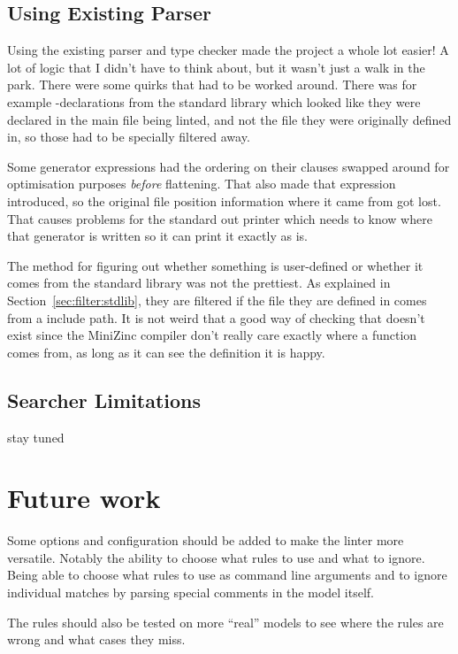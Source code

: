 \documentclass[a4paper,12pt]{article}
\newcommand{\mi}[1]{\mbox{\mzninline{#1}}}
\begin{document}
\subsection{Using Existing Parser}
Using the existing parser and type checker made the project a whole lot easier! A lot of
logic that I didn't have to think about, but it wasn't just a walk in the park. There were
some quirks that had to be worked around. There was for example \mi{enum}-declarations
from the standard library which looked like they were declared in the main file being
linted, and not the file they were originally defined in, so those had to be specially
filtered away.

Some generator expressions had the ordering on their \mi{where} clauses swapped around for
optimisation purposes \emph{before} flattening. That also made that expression introduced,
so the original file position information where it came from got lost. That causes
problems for the standard out printer which needs to know where that generator is written
so it can print it exactly as is.

The method for figuring out whether something is user-defined or whether it comes from the
standard library was not the prettiest. As explained in Section~\ref{sec:filter:stdlib},
they are filtered if the file they are defined in comes from a include path. It is not
weird that a good way of checking that doesn't exist since the MiniZinc compiler don't
really care exactly where a function comes from, as long as it can see the definition it
is happy.

\subsection{Searcher Limitations}
stay tuned

\section{Future work}
Some options and configuration should be added to make the linter more versatile. Notably
the ability to choose what rules to use and what to ignore. Being able to choose what
rules to use as command line arguments and to ignore individual matches by parsing special
comments in the model itself.

The rules should also be tested on more ``real'' models to see where the rules are wrong
and what cases they miss.


%


\newpage

\end{document}
